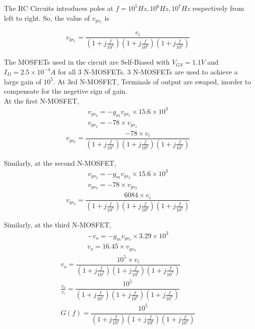 \begin{enumerate}[label=\thesubsection.\arabic*.,ref=\thesubsection.\theenumi]
The RC Circuits introduces poles at $f=10^{5} Hz, 10^{6} Hz, 10^{7} Hz$ respectively from left to right. So, the value of $v_{gs_{1}}$ is

\begin{align}
v_{gs_{1}} = \dfrac{v_{i}}{\left(1+j\frac{f}{10^{5}}\right)\left(1+j\frac{f}{10^{6}}\right)\left(1+j\frac{f}{10^{7}}\right)}
\end{align}

The MOSFETs used in the circuit are Self-Biased with $V_{GS} = 1.1V$ and $I_{D}=2.5\times 10^{-4} A$ for all 3 N-MOSFETs. 3 N-MOSFETs are used to achieve a large gain of $10^{5}$. At 3rd N-MOSFET, Terminals of output are swaped, inorder to compensate for the negetive sign of gain.\\

At the first N-MOSFET,
\begin{align}
v_{gs_{2}} = -g_{m}v_{gs_{1}}\times 15.6\times 10^{3}\\
v_{gs_{2}} = -78\times v_{gs_{1}}
\end{align}
\begin{align}
v_{gs_{2}} = \dfrac{-78\times v_{i}}{\left(1+j\frac{f}{10^{5}}\right)\left(1+j\frac{f}{10^{6}}\right)\left(1+j\frac{f}{10^{7}}\right)}
\end{align}

Similarly, at the second N-MOSFET,
\begin{align}
v_{gs_{3}} = -g_{m}v_{gs_{2}}\times 15.6\times 10^{3}\\
v_{gs_{3}} = -78 \times v_{gs_{2}}
\end{align}
\begin{align}
v_{gs_{3}} = \dfrac{6084\times v_{i}}{\left(1+j\frac{f}{10^{5}}\right)\left(1+j\frac{f}{10^{6}}\right)\left(1+j\frac{f}{10^{7}}\right)}
\end{align}

Similarly, at the third N-MOSFET,
\begin{align}
-v_{o} = -g_{m}v_{gs_{3}}\times 3.29\times 10^{3}\\
v_{o} = 16.45 \times v_{gs_{3}}
\end{align}
\begin{align}
v_{o} = \dfrac{10^{5}\times v_{i}}{\left(1+j\frac{f}{10^{5}}\right)\left(1+j\frac{f}{10^{6}}\right)\left(1+j\frac{f}{10^{7}}\right)}\\
\frac{v_{o}}{v_{i}} = \dfrac{10^{5}}{\left(1+j\frac{f}{10^{5}}\right)\left(1+j\frac{f}{10^{6}}\right)\left(1+j\frac{f}{10^{7}}\right)}\\
G(f) = \dfrac{10^{5}}{\left(1+j\frac{f}{10^{5}}\right)\left(1+j\frac{f}{10^{6}}\right)\left(1+j\frac{f}{10^{7}}\right)}
\end{align}


\end{enumerate}

